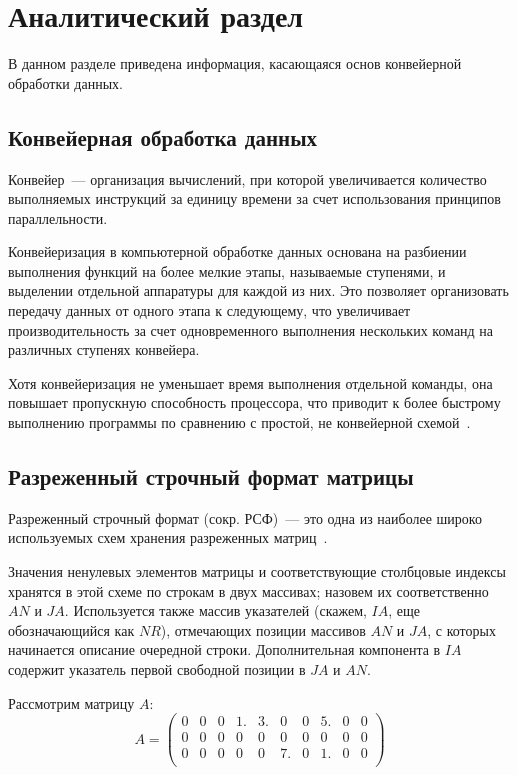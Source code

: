 \chapter{Аналитический раздел}
В данном разделе приведена информация, касающаяся основ конвейерной обработки данных.

\section{Конвейерная обработка данных}
Конвейер~--- организация вычислений, при которой увеличивается количество выполняемых инструкций за единицу времени за счет использования принципов параллельности.

Конвейеризация в компьютерной обработке данных основана на разбиении выполнения функций на более мелкие этапы, называемые ступенями, и выделении отдельной аппаратуры для каждой из них.
Это позволяет организовать передачу данных от одного этапа к следующему, что увеличивает производительность за счет одновременного выполнения нескольких команд на различных ступенях конвейера.

Хотя конвейеризация не уменьшает время выполнения отдельной команды, она повышает пропускную способность процессора, что приводит к более быстрому выполнению программы по сравнению с простой, не конвейерной схемой~\cite{conway}.

\section{Разреженный строчный формат матрицы}
Разреженный строчный формат (сокр. РСФ)~--- это одна из наиболее широко используемых схем хранения разреженных матриц~\cite{csr}.

Значения ненулевых элементов матрицы и соответствующие столбцовые индексы хранятся в этой схеме по строкам в двух массивах; назовем их соответственно $AN$ и $JA$. 
Используется также массив указателей (скажем, $IA$, еще обозначающийся как $NR$), отмечающих позиции массивов $AN$ и $JA$, с которых начинается описание очередной строки. Дополнительная компонента в $IA$ содержит указатель первой свободной позиции в $JA$ и $AN$. 

Рассмотрим матрицу $A$:
\begin{equation}
	\label{matrix}
	A = \begin{pmatrix}
		0 & 0 & 0 & 1. & 3. & 0 & 0 & 5. & 0 & 0 \\
		0 & 0 & 0 & 0 & 0 & 0 & 0 & 0 & 0 & 0 \\
		0 & 0 & 0 & 0 & 0 & 7. & 0 & 1. & 0 & 0 \\						
	\end{pmatrix}
\end{equation}

